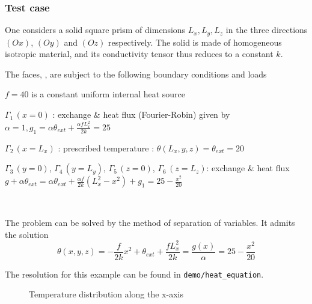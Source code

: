 \subsubsection{Test case}

One considers a solid square prism of dimensions $L_x,L_y, L_z$ in the three directions $(Ox)$, $(Oy)$ and $(Oz)$ respectively. The solid is made of homogeneous isotropic material, and its conductivity tensor thus reduces to a constant $k$. 

The faces, , are subject to the following boundary conditions and loads


\begin{itemize}
\item $f=40$ is a constant uniform internal  heat source
\item{$\Gamma_1 \,(x=0)$ : exchange \& heat flux (Fourier-Robin) given by $\alpha=1,g_1=\alpha \theta_{ext} + \frac{\alpha f L_x^2}{2k}=25$\\
\item{$\Gamma_2 \,(x=L_x)$ :  prescribed temperature : $\theta(L_x,y,z)=\theta_{ext}=20$}
\item{$\Gamma_3 \,(y=0)$, $\Gamma_4 \,(y=L_y)$, $\Gamma_5 \,(z=0)$, $\Gamma_6 \,(z=L_z)$: exchange \& heat flux $g+\alpha \theta_{ext} =\alpha\theta_{ext} +\frac{\alpha f}{2 k} (L_x^2-x^2)+g_1=25-\frac{x^2}{20}$}}\\

\end{itemize}

The problem can be solved by the method of separation of variables. It admits
the solution
$$ \displaystyle \theta(x,y,z) =-\frac{f}{2 k} x^2 + \theta_{ext} + \frac{ f L_x^2}{2k} = \frac{g(x)}{\alpha}= 25 - \frac{x^2}{20}$$

The resolution for this example can be found in {\tt demo/heat\_equation}.

\begin{figure}
\centering
{}
\caption{Temperature distribution along the x-axis}
\label{fig:reg_temp_fin}
\end{figure}

